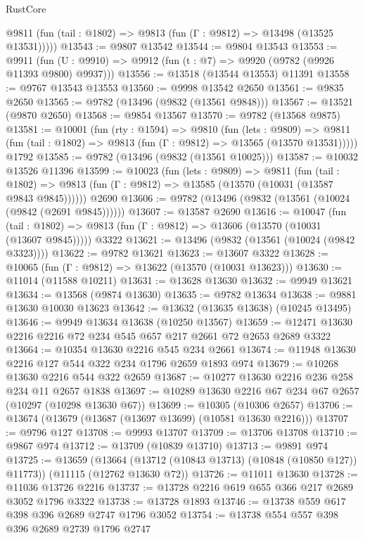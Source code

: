 \begin{lexlean}{RustCore}
\begin{coremodule}
      @9811 (fun (tail : @1802) => @9813 (fun (Γ : @9812) => @13498 (@13525 @13531)))))
@13543 := @9807 @13542
@13544 := @9804 @13543
@13553 := @9911
    (fun (U : @9910) => @9912 (fun (t : @7) => @9920 (@9782 (@9926 @11393 @9800) @9937)))
@13556 := @13518 (@13544 @13553) @11391
@13558 := @9767 @13543 @13553
@13560 := @9998 @13542 @2650
@13561 := @9835 @2650
@13565 := @9782 (@13496 (@9832 (@13561 @9848)))
@13567 := @13521 (@9870 @2650)
@13568 := @9854 @13567
@13570 := @9782 (@13568 @9875)
@13581 := @10001
    (fun (rty : @1594) =>
    @9810
      (fun (lets : @9809) =>
      @9811 (fun (tail : @1802) => @9813 (fun (Γ : @9812) => @13565 (@13570 @13531)))))
    @1792
@13585 := @9782 (@13496 (@9832 (@13561 @10025)))
@13587 := @10032 @13526 @11396
@13599 := @10023
    (fun (lets : @9809) =>
    @9811
      (fun (tail : @1802) =>
      @9813 (fun (Γ : @9812) => @13585 (@13570 (@10031 (@13587 @9843 @9845))))))
    @2690
@13606 := @9782 (@13496 (@9832 (@13561 (@10024 (@9842 (@2691 @9845))))))
@13607 := @13587 @2690
@13616 := @10047
    (fun (tail : @1802) => @9813 (fun (Γ : @9812) => @13606 (@13570 (@10031 (@13607 @9845)))))
    @3322
@13621 := @13496 (@9832 (@13561 (@10024 (@9842 @3323))))
@13622 := @9782 @13621
@13623 := @13607 @3322
@13628 := @10065 (fun (Γ : @9812) => @13622 (@13570 (@10031 @13623)))
@13630 := @11014 (@11588 @10211)
@13631 := @13628 @13630
@13632 := @9949 @13621
@13634 := @13568 (@9874 @13630)
@13635 := @9782 @13634
@13638 := @9881 @13630 @10030 @13623
@13642 := @13632 (@13635 @13638) (@10245 @13495)
@13646 := @9949 @13634 @13638 (@10250 @13567)
@13659 := @12471 @13630 @2216 @2216 @72 @234 @545 @657 @217 @2661 @72 @2653 @2689 @3322
@13664 := @10354 @13630 @2216 @545 @234 @2661
@13674 := @11948 @13630 @2216 @127 @544 @322 @234 @1796 @2659 @1893 @974
@13679 := @10268 @13630 @2216 @544 @322 @2659
@13687 := @10277 @13630 @2216 @236 @258 @234 @11 @2657 @1838
@13697 := @10289 @13630 @2216 @67 @234 @67 @2657 (@10297 (@10298 @13630 @67))
@13699 := @10305 (@10306 @2657)
@13706 := @13674 (@13679 (@13687 (@13697 @13699) (@10581 @13630 @2216)))
@13707 := @9796 @127
@13708 := @9993 @13707
@13709 := @13706 @13708
@13710 := @9867 @974
@13712 := @13709 (@10839 @13710)
@13713 := @9891 @974
@13725 := @13659
    (@13664 (@13712 (@10843 @13713) (@10848 (@10850 @127)) @11773))
    (@11115 (@12762 @13630 @72))
@13726 := @11011 @13630
@13728 := @11036 @13726 @2216
@13737 := @13728 @2216 @619 @655 @366 @217 @2689 @3052 @1796 @3322
@13738 := @13728 @1893
@13746 := @13738 @559 @617 @398 @396 @2689 @2747 @1796 @3052
@13754 := @13738 @554 @557 @398 @396 @2689 @2739 @1796 @2747

\end{coremodule}
\end{lexlean}
